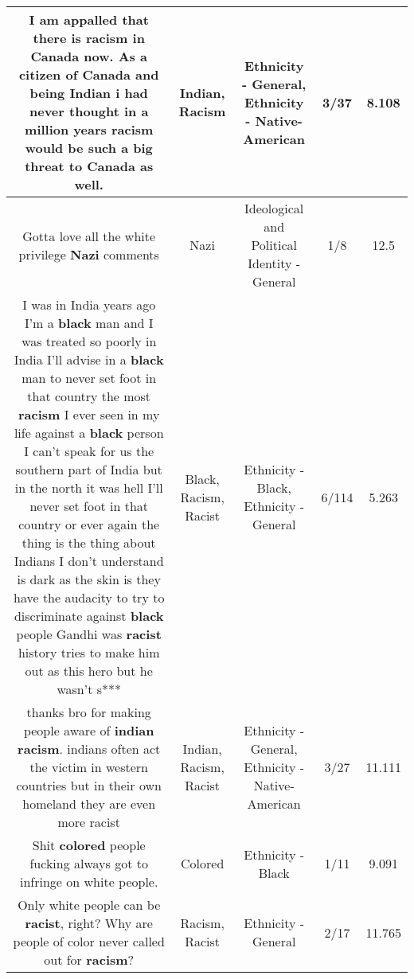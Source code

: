 \documentclass[11pt]{article}
\newlength\mylength
\begin{document}
\begin{center}
\begin{longtable}{|C{.65\mylength}|C{.30\mylength}|C{.12\mylength}|C{.12\mylength}|C{.12\mylength}|}
  \small I am appalled that there is \textbf{racism} in Canada now. As a citizen of Canada and being \textbf{Indian} i had never thought in a million years \textbf{racism} would be such a big threat to Canada as well.\normalsize   & Indian, Racism & Ethnicity - General, Ethnicity - Native-American & 3/37 & 8.108 \\  \hline
  \small Gotta love all the white privilege \textbf{Nazi} comments\normalsize   & Nazi &  Ideological and Political Identity - General & 1/8 & 12.5 \\  \hline
  \small I was in India years ago I'm a \textbf{black} man and I was treated so poorly in India I'll advise in a \textbf{black} man to never set foot in that country the most \textbf{racism} I ever seen in my life against a \textbf{black} person I can't speak for us the southern part of India but in the north it was hell I'll never set foot in that country or ever again the thing is the thing about Indians I don't understand is dark as the skin is they have the audacity to try to discriminate against \textbf{black} people Gandhi was \textbf{racist} history tries to make him out as this hero but he wasn't s***\normalsize   & Black, Racism, Racist & Ethnicity - Black, Ethnicity - General & 6/114 & 5.263 \\  \hline
  \small thanks bro for making people aware of \textbf{indian} \textbf{racism}. indians often act the victim in western countries but in their own homeland they are even more racist\normalsize   & Indian, Racism, Racist & Ethnicity - General, Ethnicity - Native-American & 3/27 & 11.111 \\  \hline
  \small Shit \textbf{colored} people fucking always got to infringe on white people.\normalsize   & Colored & Ethnicity - Black & 1/11 & 9.091 \\  \hline
  \small Only white people can be \textbf{racist}, right?  Why are people of color never called out for \textbf{racism}?\normalsize   & Racism, Racist & Ethnicity - General & 2/17 & 11.765 \\  \hline

\end{longtable}
\end{center}
\end{document}
